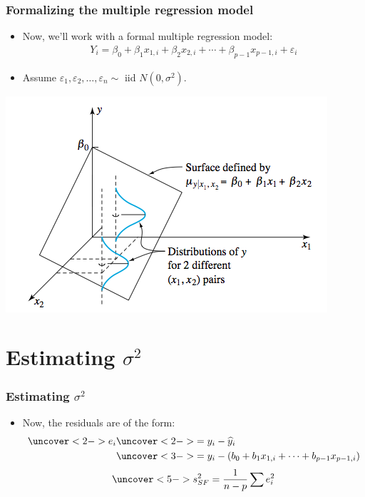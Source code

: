 \documentclass[handout]{beamer}\usepackage{graphicx, color}
\providecommand{\e}{\varepsilon}
\providecommand{\wh}[1]{\widehat{#1}}
\numberwithin{equation}{section}
\begin{document}
\begin{frame}
\frametitle{Formalizing the multiple regression model}
\begin{itemize}
\item Now, we'll work with a formal multiple regression model:
\pause \begin{align*}
Y_i = \beta_0 + \beta_1 x_{1, i} + \beta_2 x_{2, i} + \cdots + \beta_{p-1} x_{p-1, i} + \e_i
\end{align*}
\pause \item Assume $\e_1, \e_2, \ldots, \e_n \sim$ iid $N(0,\sigma^2)$.
\end{itemize}
\begin{center}
 \includegraphics{../../fig/mulregpict.png}
\end{center}
\end{frame}


\section{Estimating $\sigma^2$}

\begin{frame}
\frametitle{Estimating $\sigma^2$}
\begin{itemize}
\item Now, the residuals are of the form:
\begin{align*}
\uncover<2->{e_i} &\uncover<2->{= y_i - \wh{y}_i} \\
&\uncover<3->{= y_i - (b_0 + b_1 x_{1,i} + \cdots + b_{p-1} x_{p-1,i})}
\end{align*}
\begin{align*}
\uncover<5->{s^2_{SF} = \frac{1}{n-p} \sum e_i^2}
\end{align*}
\end{itemize}
\end{frame}
\end{document}
